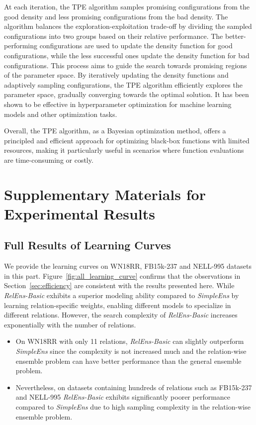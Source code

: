 \documentclass[11pt,a4paper]{article}
\begin{document}
  At each iteration, the TPE algorithm samples promising configurations from the good density and less promising configurations from the bad density. The algorithm balances the exploration-exploitation trade-off by dividing the sampled configurations into two groups based on their relative performance. The better-performing configurations are used to update the density function for good configurations, while the less successful ones update the density function for bad configurations. This process aims to guide the search towards promising regions of the parameter space.
  By iteratively updating the density functions and adaptively sampling configurations, the TPE algorithm efficiently explores the parameter space, gradually converging towards the optimal solution. It has been shown to be effective in hyperparameter optimization for machine learning models and other optimization tasks.
  
  Overall, the TPE algorithm, as a Bayesian optimization method, offers a principled and efficient approach for optimizing black-box functions with limited resources, making it particularly useful in scenarios where function evaluations are time-consuming or costly.
  
  \section{Supplementary Materials for Experimental Results}
  


  

  
  
  
  
  
  \subsection{Full Results of Learning Curves}
  \label{app:efficiency}
  
  We provide the learning curves on WN18RR, FB15k-237 and NELL-995 datasets
  in this part.
  Figure~\ref{fig:all_learning_curve} confirms that the observations in Section~\ref{sec:efficiency} are consistent with the results presented here. While  \textit{RelEns-Basic} exhibits a superior modeling ability compared to  \textit{SimpleEns} by learning relation-specific weights, enabling different models to specialize in different relations. 
  However, the search complexity of  \textit{RelEns-Basic} increases exponentially with the number of relations. 
  \begin{itemize}
    \item On WN18RR with only 11 relations, \textit{RelEns-Basic} can slightly outperform \textit{SimpleEns}
    since the complexity is not increased much 
    and the relation-wise ensemble problem can have better performance than the general ensemble problem.
    \item Nevertheless, 
    on datasets containing hundreds of relations such as FB15k-237 and NELL-995 
    \textit{RelEns-Basic} exhibits significantly poorer performance compared to  \textit{SimpleEns} due to high sampling complexity in the relation-wise ensemble problem.
  \end{itemize}
  
\end{document}
